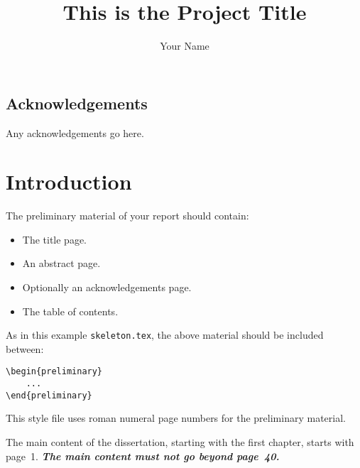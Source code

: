 \documentclass[msc,deptreport]{infthesis} %
\begin{document}
\begin{preliminary}

\title{This is the Project Title}

\author{Your Name}


\maketitle

\section*{Acknowledgements}
Any acknowledgements go here. 

\tableofcontents
\end{preliminary}


\chapter{Introduction}

The preliminary material of your report should contain:
\begin{itemize}
\item
The title page.
\item
An abstract page.
\item
Optionally an acknowledgements page.
\item
The table of contents.
\end{itemize}

As in this example \texttt{skeleton.tex}, the above material should be
included between:
\begin{verbatim}
\begin{preliminary}
    ...
\end{preliminary}
\end{verbatim}
This style file uses roman numeral page numbers for the preliminary material.

The main content of the dissertation, starting with the first chapter,
starts with page~1. \emph{\textbf{The main content must not go beyond page~40.}}
\end{document}
